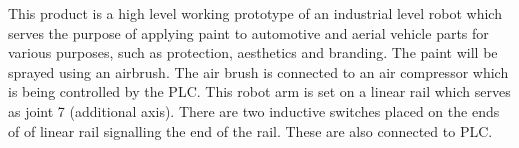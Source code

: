This product is a high level working prototype of an industrial level robot which serves the purpose of applying paint to automotive and aerial vehicle parts for various purposes, such as protection, aesthetics and branding. The paint will be sprayed using an airbrush. The air brush is connected to an air compressor which is being controlled by the PLC. This robot arm is set on a linear rail which serves as joint 7 (additional axis). There are two inductive switches placed on the ends of of linear rail signalling the end of the rail. These are also connected to PLC.